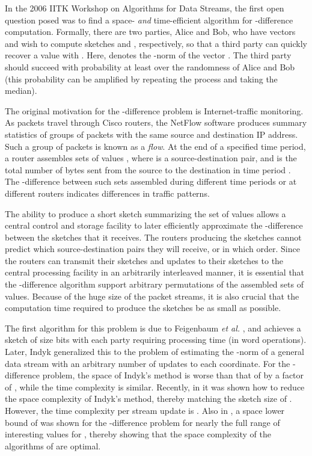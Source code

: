 \documentclass[letterpaper,11pt]{article}
\begin{document}
In the 2006 IITK Workshop on Algorithms for Data Streams, the first
open question posed \cite{IITK} was to find a space- {\it and}
time-efficient algorithm for -difference computation. Formally,
there are two parties, Alice and Bob, who have vectors  and wish to compute sketches 
and , respectively, so that a third party can quickly recover a
value  with . Here, 
denotes the -norm of the vector . The third party should
succeed with probability at least  over the randomness of Alice
and Bob (this probability can be amplified by
repeating the process and taking the median).

The original motivation \cite{FKSV02} for the -difference problem is
Internet-traffic monitoring. As packets travel through
Cisco routers, the NetFlow software \cite{CN98} produces summary
statistics of groups of packets with the same source and destination
IP address. Such a group of packets is known as a {\it flow}. At the
end of a specified time period, a router assembles sets of values , where  is a source-destination pair, and  is the
total number of bytes sent from the source to the destination in time
period . The -difference between such sets assembled during
different time periods or at different routers indicates differences
in traffic patterns.

The ability to produce a short sketch summarizing the set of values
allows a central control and storage facility to later efficiently
approximate the -difference between the sketches that it
receives. The routers producing the sketches cannot
predict which source-destination pairs they will receive, or in which
order. Since the routers can transmit their sketches and updates
to their sketches to the central processing facility in an arbitrarily
interleaved manner, it is essential that the -difference
algorithm support arbitrary permutations of the assembled sets of
values. Because of the huge size of the packet streams, it is also
crucial that the computation time required to produce the sketches
be as small as possible.

The first algorithm for this problem is due to Feigenbaum {\it et al.}
\cite{FKSV02}, and achieves a sketch of size 
bits with each party requiring  processing
time (in word operations). Later, Indyk \cite{Indyk06} generalized this
to the
problem of estimating the -norm of a general data stream with
an arbitrary number of updates to each coordinate. For the
-difference problem, the space of Indyk's method is worse than
that of \cite{FKSV02} by a factor of , while the time
complexity is similar. Recently, in \cite{KNW08} it was shown how to
reduce the space complexity of Indyk's method, thereby matching the
sketch size of \cite{FKSV02}. 
However, the time complexity per stream update 
is . Also in \cite{KNW08}, a space lower
bound of  was shown for the
-difference problem for nearly the full range of interesting
values for , thereby showing that the space complexity of
the algorithms of \cite{FKSV02, KNW08} are optimal.
\end{document}
